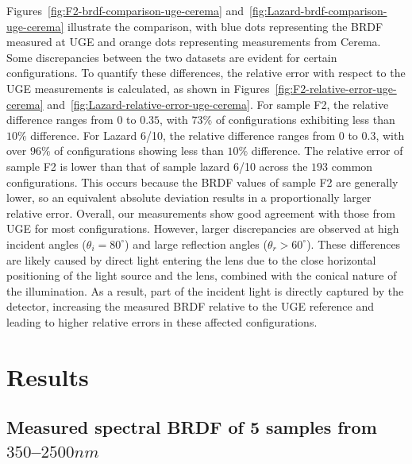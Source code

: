 Figures~\ref{fig:F2-brdf-comparison-uge-cerema} and~\ref{fig:Lazard-brdf-comparison-uge-cerema} illustrate the comparison, with blue dots representing the BRDF measured at UGE and orange dots representing measurements from Cerema.
Some discrepancies between the two datasets are evident for certain configurations.
To quantify these differences, the relative error with respect to the UGE measurements is calculated, as shown in Figures~\ref{fig:F2-relative-error-uge-cerema} and~\ref{fig:Lazard-relative-error-uge-cerema}.
For sample F2, the relative difference ranges from $0$ to $0.35$, with $73\%$ of configurations exhibiting less than $10\%$ difference. For Lazard 6/10, the relative difference ranges from $0$ to $0.3$, with over $96\%$ of configurations showing less than $10\%$ difference.
The relative error of sample F2 is lower than that of sample lazard 6/10 across the $193$ common configurations.
This occurs because the BRDF values of sample F2 are generally lower, so an equivalent absolute deviation results in a proportionally larger relative error.
Overall, our measurements show good agreement with those from UGE for most configurations.
However, larger discrepancies are observed at high incident angles ($\theta_i = 80^\circ$) and large reflection angles ($\theta_r > 60^\circ$).
These differences are likely caused by direct light entering the lens due to the close horizontal positioning of the light source and the lens, combined with the conical nature of the illumination.
As a result, part of the incident light is directly captured by the detector, increasing the measured BRDF relative to the UGE reference and leading to higher relative errors in these affected configurations.

\section{Results}


\subsection{Measured spectral BRDF of 5 samples from $350$–$2500nm$}

